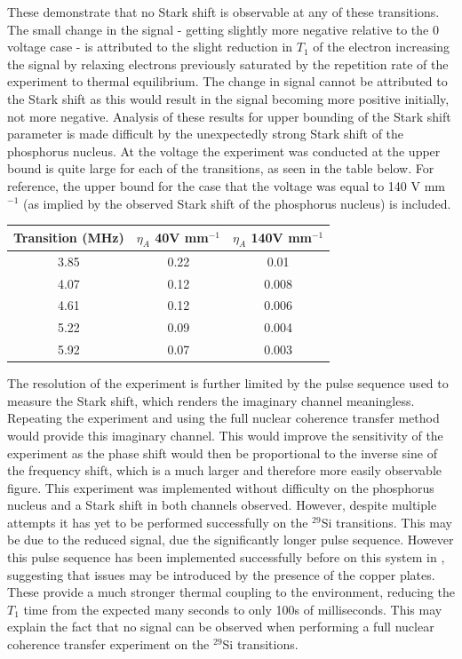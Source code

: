 These demonstrate that no Stark shift is observable at any of these transitions. 
The small change in the signal - getting slightly more negative relative to the 0 voltage case - is attributed to the slight reduction in $T_1$ of the electron increasing the signal by relaxing electrons previously saturated by the repetition rate of the experiment to thermal equilibrium. 
The change in signal cannot be attributed to the Stark shift as this would result in the signal becoming more positive initially, not more negative. 
Analysis of these results for upper bounding of the Stark shift parameter is made difficult by the unexpectedly strong Stark shift of the phosphorus nucleus.
At the voltage the experiment was conducted at the upper bound is quite large for each of the transitions, as seen in the table below.
For reference, the upper bound for the case that the voltage was equal to 140 V mm$^{-1}$ (as implied by the observed Stark shift of the phosphorus nucleus) is included. 

\begin{center}
\begin{tabular}{||c || c | c ||}
\hline
Transition (MHz)& $\eta_A$ 40V mm$^{-1}$ & $\eta_A$ 140V mm$^{-1}$\\
\hline
3.85 & 0.22 & 0.01\\
4.07 & 0.12 & 0.008\\
4.61 & 0.12 & 0.006\\
5.22 & 0.09 & 0.004\\
5.92 & 0.07 & 0.003\\
\hline
\end{tabular}
\end{center}

The resolution of the experiment is further limited by the pulse sequence used to measure the Stark shift, which renders the imaginary channel meaningless.
Repeating the experiment and using the full nuclear coherence transfer method would provide this imaginary channel.
This would improve the sensitivity of the experiment as the phase shift would then be proportional to the inverse sine of the frequency shift, which is a much larger and therefore more easily observable figure.
This experiment was implemented without difficulty on the phosphorus nucleus and a Stark shift in both channels observed.
However, despite multiple attempts it has yet to be performed successfully on the $^{29}$Si transitions.
This may be due to the reduced signal, due the significantly longer pulse sequence.
However this pulse sequence has been implemented successfully before on this system in \cite{Wolfowicz2016a}, suggesting that issues may be introduced by the presence of the copper plates.
These provide a much stronger thermal coupling to the environment, reducing the $T_1$ time from the expected many seconds to only 100s of milliseconds. 
This may explain the fact that no signal can be observed when performing a full nuclear coherence transfer experiment on the $^{29}$Si transitions.
\\